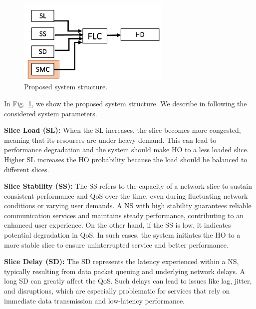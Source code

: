\documentclass[graybox]{svmult}
\begin{document}
\begin{figure}\centering
	\includegraphics[width=0.65\textwidth]{figure/System/HODFLC.png}%
	\caption{Proposed system structure.}\label{fig:FLC1}
\end{figure}

 
In Fig.~\ref{fig:FLC1}, we show the proposed system structure. We describe in following the considered system parameters.

\textbf{Slice Load (SL):} When the SL increases, the slice becomes more congested, meaning that its resources are under heavy demand. This can lead to performance degradation and the system should make
HO to a less loaded slice.  Higher SL increases the HO probability because the load should be balanced 
to different slices.  

\textbf{Slice Stability (SS):} The SS refers to the capacity of a network slice to sustain consistent performance and QoS over the time, even during fluctuating network conditions or varying user demands. A NS with high stability guarantees reliable communication services and maintains steady performance, contributing to an enhanced user experience. On the other hand, if the SS is low, it indicates potential degradation in QoS. In such cases, the system initiates the HO to a more stable slice to ensure uninterrupted service and better performance.

\textbf{Slice Delay (SD):} The SD represents the latency experienced within a NS, typically resulting from data packet queuing and underlying network delays. A long SD can greatly affect the QoS. Such delays can lead to issues like lag, jitter, and disruptions, which are especially problematic for services that rely on immediate data transmission and low-latency performance.
\end{document}
